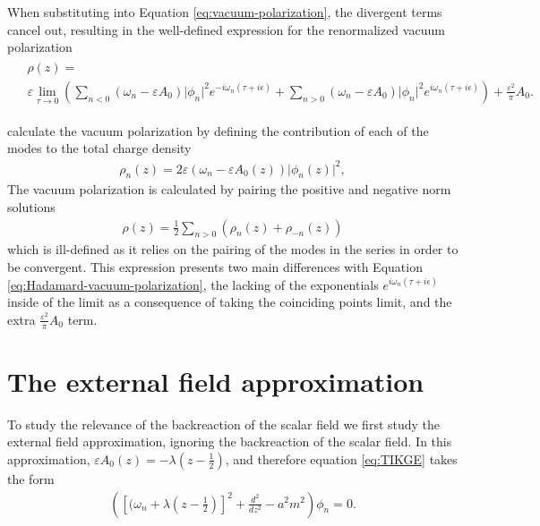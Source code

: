 When substituting into Equation \eqref{eq:vacuum-polarization}, the divergent terms cancel out, resulting in the well-defined expression for the renormalized vacuum polarization 
\begin{align}
	\begin{split}
			&\rho(z) =  \\
			&\varepsilon\lim_{\tau \to 0}\left(
			\sum_{n< 0}^{} (\omega_n - \varepsilon A_0) \lvert\phi_n\rvert^2 e^{-i \omega_n (\tau + i\epsilon)}  +
			\sum_{n> 0}^{} (\omega_n - \varepsilon A_0) \lvert\phi_n\rvert^2 e^{i \omega_n (\tau + i\epsilon)}  \right)
			+ \frac{\varepsilon^2}{\pi} A_0.
	\end{split}
	\label{eq:Hadamard-vacuum-polarization}
\end{align}

\cite{Ambj1983} calculate the vacuum polarization by defining the contribution of each of the modes to the total charge density
\begin{align}
    \rho_n (z) = 2 \varepsilon (\omega_n - \varepsilon A_0(z)) \lvert \phi_n(z)\rvert ^2,
\end{align}
 The vacuum polarization is calculated by pairing the positive and negative norm solutions 
\begin{align}
\rho(z) = \frac{1}{2}\sum_{n>0}\left( \rho_n(z) + \rho_{-n}(z)\right)
\end{align}
which is ill-defined as it relies on the pairing of the modes in the series in order to be convergent. This expression presents two main differences with Equation \eqref{eq:Hadamard-vacuum-polarization}, the lacking of the exponentials $e^{i\omega_n (\tau + i \epsilon)}$ inside of the limit as a consequence of taking the coinciding points limit, and the extra $\frac{\varepsilon^2}{\pi} A_0$ term.


\section{The external field approximation}
To study the relevance of the backreaction of the scalar field we first study the external field approximation, ignoring the backreaction of the scalar field. In this approximation, $\varepsilon A_0(z) = -\lambda \left( z-\frac{1}{2} \right) $, and therefore equation \eqref{eq:TIKGE} takes the form
		\begin{align}
			\left( \left[(\omega_n + \lambda\left( z-\frac{1}{2} \right)\right] ^2 + \frac{d^2}{dz^2} - a^2m^2 \right) \phi_n = 0.
			\label{eq:klein-gordon-in-the-external-field-approximation}
		\end{align}

